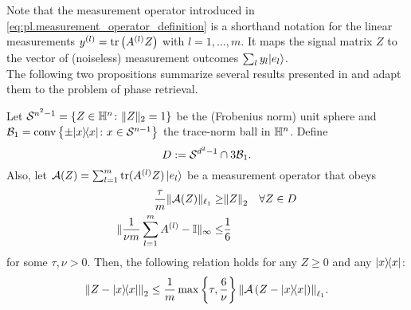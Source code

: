Note that the measurement operator introduced in \cref{eq:pl.measurement_operator_definition} is a shorthand notation for the linear measurements $y^{(l)} = \operatorname{tr}  \left( A^{(l)}  Z \right)$ with $l=1,\ldots,m$.
It maps the signal matrix $Z$ to the vector of (noiseless) measurement outcomes $\sum_l y_l \ket{e_l}$.\\


The following two propositions summarize several results presented in \cite{Kabanava_2015_Stable} and adapt them to the problem of phase retrieval.

\begin{proposition}%
  \label{prop:nsp_implication}
  Let $\mathcal{S}^{n^2-1}=\left\{  Z \in \mathbb{H}^n\colon \|  Z \|_2=1 \right\}$ be the (Frobenius norm) unit sphere and $\mathcal{B}_1 = \mathrm{conv} \left\{ \pm | x \rangle \! \langle  x| \colon  x \in \mathcal{S}^{n-1} \right\}$ the trace-norm ball in $\mathbb{H}^n$.
  Define
  \[
    D := \mathcal{S}^{d^2-1} \cap 3 \mathcal{B}_1.
    \label{eq:pl.D}
  \]
  Also, let $\mathcal{A}( Z) = \sum_{l=1}^m \tr ( A\ind{l}  Z ) \,  \ket{e_l}$ be a measurement operator that obeys
  \begin{align}
      \frac{ \tau}{m} \| \mathcal{A}( Z) \|_{\ell_1} \geq& {\Vert Z\Vert}_2 \quad \forall  Z \in D \label{eq:pl.nsp}\\
      \| \frac{1}{\nu m}\sum_{l=1}^m  A^{(l)} -  \mathbb{I} \|_\infty \leq& \frac{1}{6}\label{eq:pl.approx_povm}
  \end{align}
  for some $\tau,\nu >0$.
  Then, the following relation holds for any $ Z \geq 0$ and any $\ketbra x$:
  \[
    \label{eq:pl.rec_guarantee}
    \Fnorm{Z - \ketbra{x}}
    \leq \frac{1}{m} \max \left\{ \tau, \frac{6}{\nu} \right\}  \Norm{\mathcal{A}\left( Z - \ketbra{x} \right)}_{\ell_1}.
  \]
\end{proposition}


